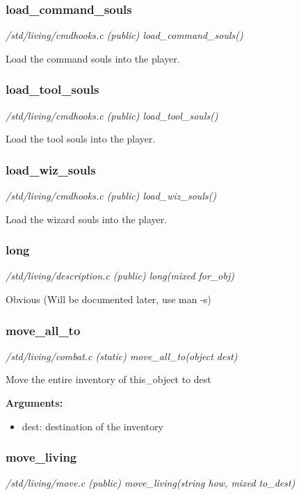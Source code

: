 \subsubsection{load\_command\_souls}

{\em /std/living/cmdhooks.c (public) load\_command\_souls()}

Load the command souls into the player.


\subsubsection{load\_tool\_souls}

{\em /std/living/cmdhooks.c (public) load\_tool\_souls()}

Load the tool souls into the player.


\subsubsection{load\_wiz\_souls}

{\em /std/living/cmdhooks.c (public) load\_wiz\_souls()}

Load the wizard souls into the player.


\subsubsection{long}

{\em /std/living/description.c (public) long(mixed for\_obj)}

Obvious (Will be documented later, use man -s)


\subsubsection{move\_all\_to}

{\em /std/living/combat.c (static) move\_all\_to(object dest)}

Move the entire inventory of this\_object to dest

{\bf Arguments:}
\begin{itemize}
\item      dest: destination of the inventory
\end{itemize}


\subsubsection{move\_living}

{\em /std/living/move.c (public) move\_living(string how, mixed to\_dest)}

